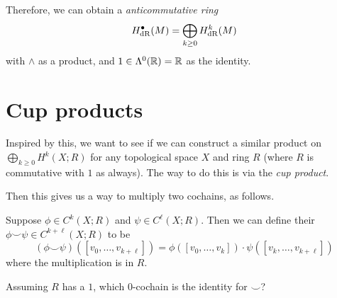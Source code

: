 Therefore, we can obtain a \emph{anticommutative ring}
\[ H_{\mathrm{dR}}^\bullet(M) = \bigoplus_{k \ge 0} H_{\mathrm{dR}}^k(M) \]
with $\wedge$ as a product, and $1 \in \Lambda^0(\mathbb R) = \mathbb R$ as the identity.

\section{Cup products}
Inspired by this, we want to see if we can construct a similar product
on $\bigoplus_{k \ge 0} H^k(X; R)$ for any topological space $X$ and ring $R$
(where $R$ is commutative with $1$ as always).
The way to do this is via the \emph{cup product}.

Then this gives us a way to multiply two cochains, as follows.
\begin{definition}
	Suppose $\phi \in C^k(X;R)$ and $\psi \in C^\ell(X;R)$.
	Then we can define their 
	$\phi\smile\psi \in C^{k+\ell}(X;R)$ to be
	\[
		(\phi\smile\psi)([v_0, \dots, v_{k+\ell}])
		=
		\phi\left( [v_0, \dots, v_k] \right)
		\cdot
		\psi\left( [v_k, \dots, v_{k+\ell}] \right)
	\]
	where the multiplication is in $R$.
\end{definition}

\begin{ques}
	Assuming $R$ has a $1$, which $0$-cochain is the identity for $\smile$?
\end{ques}

